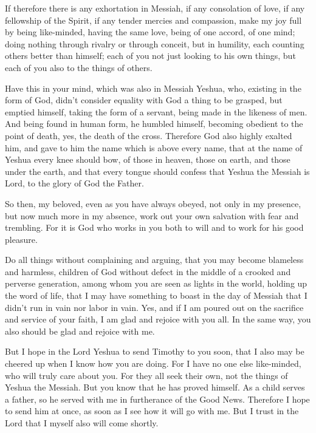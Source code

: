 \mychapter{} \myverse*{}If therefore there is any exhortation in Messiah, if any consolation
of love, if any fellowship of the Spirit, if any tender mercies and compassion,
\myverse{}make my joy full by being like-minded, having the same love, being of one accord,
of one mind;
\myverse{}doing nothing through rivalry or through conceit, but in humility, each counting
others better than himself;
\myverse{}each of you not just looking to his own things, but each of you also to the
things of others.

\myverse{}Have this in your mind, which was also in Messiah Yeshua,
\myverse{}who, existing in the form of God, didn’t consider equality with God a thing
to be grasped,
\myverse{}but emptied himself, taking the form of a servant, being made in the likeness
of men.
\myverse{}And being found in human form, he humbled himself, becoming obedient to the
point of death, yes, the death of the cross.
\myverse{}Therefore God also highly exalted him, and gave to him the name which is above
every name,
\myverse{}that at the name of Yeshua every knee should bow, of those in heaven, those
on earth, and those under the earth,
\myverse{}and that every tongue should confess that Yeshua the Messiah is Lord, to the
glory of God the Father.

\myverse{}So then, my beloved, even as you have always obeyed, not only
in my presence, but now much more in my absence, work out your own salvation with fear and trembling.
\myverse{}For it is God who works in you both to will and to work for his good pleasure.

\myverse{}Do all things without complaining and arguing,
\myverse{}that you may become blameless and harmless, children of God without defect
in the middle of a crooked and perverse generation, among whom you are seen as lights in the world,
\myverse{}holding up the word of life, that I may have something to boast in the day
of Messiah that I didn’t run in vain nor labor in vain.
\myverse{}Yes, and if I am poured out on the sacrifice and service of your faith, I
am glad and rejoice with you all.
\myverse{}In the same way, you also should be glad and rejoice with me.

\myverse{}But I hope in the Lord Yeshua to send Timothy to you soon, that
I also may be cheered up when I know how you are doing.
\myverse{}For I have no one else like-minded, who will truly care about you.
\myverse{}For they all seek their own, not the things of Yeshua the Messiah.
\myverse{}But you know that he has proved himself. As a child serves a father, so he
served with me in furtherance of the Good News.
\myverse{}Therefore I hope to send him at once, as soon as I see how it will go with
me.
\myverse{}But I trust in the Lord that I myself also will come shortly.

